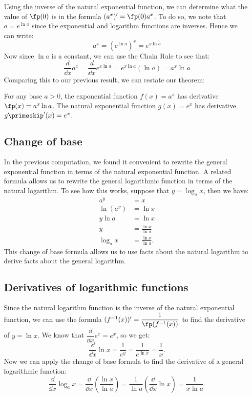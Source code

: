Using the inverse of the natural exponential function, we can determine what the value of $\fp(0)$ is in the formula $(a^x)'=\fp(0)a^x$. To do so, we note that $a=e^{\ln a}$ since the exponential and logarithm functions are inverses. Hence we can write:
\[a^x=\left(e^{\ln a}\right)^x=e^{x\ln a}\]
Now since $\ln a$ is a constant, we can use the Chain Rule to see that:
\[\frac d{\dd x} a^x=\frac d{\dd x} e^{x\ln a} =e^{x\ln a}(\ln a) =a^x\ln a\]
Comparing this to our previous result, we can restate our theorem:

\begin{theorem}\label{thm_exp_deriv}
For any base $a>0$, the exponential function $f(x)=a^x$ has derivative $\fp(x)=a^x\ln a$. The natural exponential function $g(x)=e^x$ has derivative $g\primeskip'(x)=e^x$.
\end{theorem}

\subsection{Change of base}

In the previous computation, we found it convenient to rewrite the general exponential function in terms of the natural exponential function. A related formula allows us to rewrite the general logarithmic function in terms of the natural logarithm.  To see how this works, suppose that $y=\log_ax$, then we have:
\begin{align*}
a^y&=x \\
\ln(a^y)&=\ln x\\
y\ln a&=\ln x\\
y&=\frac{\ln x}{\ln a}\\
\log_a x&=\frac{\ln x}{\ln a}.
\end{align*}
This change of base formula allows us to use facts about the natural logarithm to derive facts about the general logarithm.

\subsection{Derivatives of logarithmic functions}

Since the natural logarithm function is the inverse of the natural exponential function, we can use the formula $(f^{-1}(x))'=\dfrac1{\fp(f^{-1}(x))}$ to find the derivative of $y=\ln x$. We know that $\dfrac\dd{\dd x}e^x=e^x$, so we get:
\[\frac\dd{\dd x}\ln x=\frac1{e^y}=\frac1{e^{\ln x}}=\frac1x.\]
Now we
can apply the change of base formula to find the derivative of a general logarithmic function:
\[\frac{\dd}{\dd x}\log_ax=\frac{\dd}{\dd x}\left(\frac{\ln x}{\ln a}\right) =\frac 1{\ln a}\left(\frac{\dd}{\dd x}\ln x\right)=\frac 1{x\ln a}.\]

